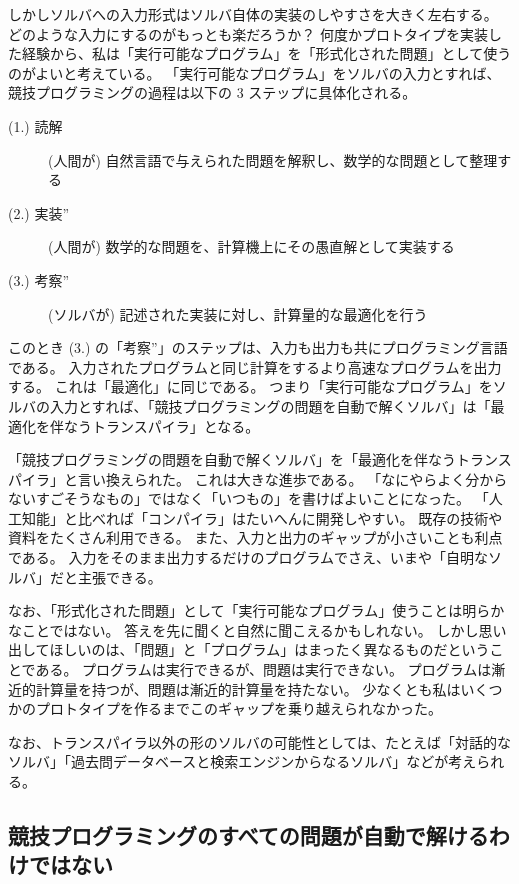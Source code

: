 \documentclass{ltjsarticle}
\begin{document}
しかしソルバへの入力形式はソルバ自体の実装のしやすさを大きく左右する。
どのような入力にするのがもっとも楽だろうか？
何度かプロトタイプを実装した経験から、私は「実行可能なプログラム」を「形式化された問題」として使うのがよいと考えている。
「実行可能なプログラム」をソルバの入力とすれば、競技プログラミングの過程は以下の 3 ステップに具体化される。

\begin{description}
    \item[(1.) 読解] (人間が) 自然言語で与えられた問題を解釈し、数学的な問題として整理する
    \item[(2.) 実装''] (人間が) 数学的な問題を、計算機上にその愚直解として実装する
    \item[(3.) 考察''] (ソルバが) 記述された実装に対し、計算量的な最適化を行う
\end{description}

このとき (3.) の「考察''」のステップは、入力も出力も共にプログラミング言語である。
入力されたプログラムと同じ計算をするより高速なプログラムを出力する。
これは「最適化」に同じである。
つまり「実行可能なプログラム」をソルバの入力とすれば、「競技プログラミングの問題を自動で解くソルバ」は「最適化を伴なうトランスパイラ」となる。

「競技プログラミングの問題を自動で解くソルバ」を「最適化を伴なうトランスパイラ」と言い換えられた。
これは大きな進歩である。
「なにやらよく分からないすごそうなもの」ではなく「いつもの」を書けばよいことになった。
「人工知能」と比べれば「コンパイラ」はたいへんに開発しやすい。
既存の技術や資料をたくさん利用できる。
また、入力と出力のギャップが小さいことも利点である。
入力をそのまま出力するだけのプログラムでさえ、いまや「自明なソルバ」だと主張できる。

なお、「形式化された問題」として「実行可能なプログラム」使うことは明らかなことではない。
答えを先に聞くと自然に聞こえるかもしれない。
しかし思い出してほしいのは、「問題」と「プログラム」はまったく異なるものだということである。
プログラムは実行できるが、問題は実行できない。
プログラムは漸近的計算量を持つが、問題は漸近的計算量を持たない。
少なくとも私はいくつかのプロトタイプを作るまでこのギャップを乗り越えられなかった。

なお、トランスパイラ以外の形のソルバの可能性としては、たとえば「対話的なソルバ」「過去問データベースと検索エンジンからなるソルバ」などが考えられる。



\subsection{競技プログラミングのすべての問題が自動で解けるわけではない}
\end{document}
